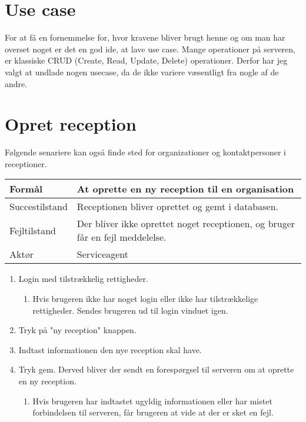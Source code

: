 \section{Use case}
For at få en fornemmelse for, hvor kravene bliver brugt henne og om man har overset noget er det en god ide, at lave use case\citep{LarmanUml}.
Mange operationer på serveren, er klassiske CRUD (Create, Read, Update, Delete) operationer. Derfor har jeg valgt at undlade nogen usecase, da de ikke variere væsentligt fra nogle af de andre.


\section{Opret reception}
Følgende senariere kan også finde sted for organizationer og kontaktpersoner i receptioner.

\begin{table}[h]
    \begin{tabular}{|p{3cm}|p{8.3cm}|}
    \hline
    Formål         & At oprette en ny reception til en organisation                              \\ \hline
    Succestilstand & Receptionen bliver oprettet og gemt i databasen.                            \\ \hline
    Fejltilstand   & Der bliver ikke oprettet noget receptionen, og bruger 
                     får en fejl meddelelse. \\ \hline
    Aktør          & Serviceagent                                                                \\ \hline
    \end{tabular}
\end{table}

\begin{enumerate}
  \item Login med tilstrækkelig rettigheder.
  \begin{enumerate}
    \item Hvis brugeren ikke har noget login eller ikke har tilstrækkelige rettigheder. Sendes brugeren ud til login vinduet igen.
  \end{enumerate}
  \item Tryk på "ny reception" knappen.
  \item Indtast informationen den nye reception skal have.
  \item Tryk gem. Derved bliver der sendt en forespørgsel til serveren om at oprette en ny reception.
  \begin{enumerate}
    \item Hvis brugeren har indtastet ugyldig informationen eller har mistet forbindelsen til serveren, får brugeren at vide at der er sket en fejl.
  \end{enumerate}
\end{enumerate}

